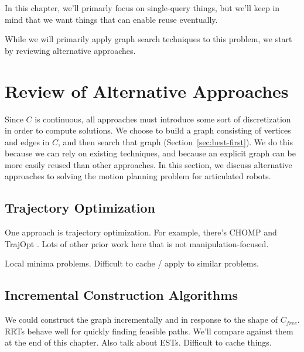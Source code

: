 \documentclass{report}
\begin{document}
In this chapter,
we'll primarly focus on single-query things,
but we'll keep in mind that we want things that can enable reuse eventually.

While we will primarily apply graph search techniques to this problem,
we start by reviewing alternative approaches.

\section{Review of Alternative Approaches}
\label{sec:related-work}

Since $C$ is continuous,
all approaches must introduce some sort of discretization
in order to compute solutions.
We choose to build a graph consisting of vertices and edges in $C$,
and then search that graph (Section~\ref{sec:best-first}).
We do this because we can rely on existing techniques,
and because an explicit graph can be more easily reused than other
approaches.
In this section, we discuss alternative approaches to solving
the motion planning problem for articulated robots.

\subsection{Trajectory Optimization}

One approach is trajectory optimization.
For example, there's CHOMP \cite{zucker2013chomp}
and TrajOpt \cite{schulman2013trajopt}.
Lots of other prior work here that is not manipulation-focused.

Local minima problems.
Difficult to cache / apply to similar problems.

\subsection{Incremental Construction Algorithms}

We could construct the graph incrementally and in response to the shape
of $C_{free}$.
RRTs behave well for quickly finding feasible paths.
We'll compare against them at the end of this chapter.
Also talk about ESTs.
Difficult to cache things.

%
\end{document}
